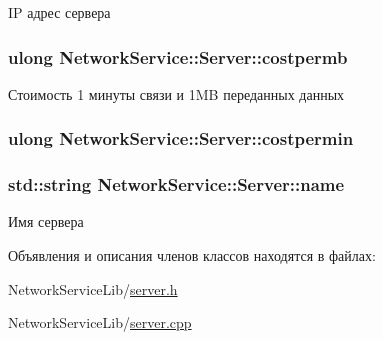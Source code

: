 I\+P адрес сервера 

\hypertarget{class_network_service_1_1_server_a44f0b3aacbbbbbcf0216974c23d1baf1}{}
\subsubsection[{costpermb}]{\setlength{\rightskip}{0pt plus 5cm}ulong Network\+Service\+::\+Server\+::costpermb\hspace{0.3cm}{\ttfamily [private]}}\label{class_network_service_1_1_server_a44f0b3aacbbbbbcf0216974c23d1baf1}


Стоимость 1 минуты связи и 1\+M\+B переданных данных 

\hypertarget{class_network_service_1_1_server_a8b24807f5ca15d5348734cf5f4fe96ff}{}
\subsubsection[{costpermin}]{\setlength{\rightskip}{0pt plus 5cm}ulong Network\+Service\+::\+Server\+::costpermin\hspace{0.3cm}{\ttfamily [private]}}\label{class_network_service_1_1_server_a8b24807f5ca15d5348734cf5f4fe96ff}
\hypertarget{class_network_service_1_1_server_aaab7735b4b5809169ecb92fa66f0bca7}{}
\subsubsection[{name}]{\setlength{\rightskip}{0pt plus 5cm}std\+::string Network\+Service\+::\+Server\+::name\hspace{0.3cm}{\ttfamily [private]}}\label{class_network_service_1_1_server_aaab7735b4b5809169ecb92fa66f0bca7}


Имя сервера 



Объявления и описания членов классов находятся в файлах\+:\begin{DoxyCompactItemize}
\item 
Network\+Service\+Lib/\hyperlink{server_8h}{server.\+h}\item 
Network\+Service\+Lib/\hyperlink{server_8cpp}{server.\+cpp}\end{DoxyCompactItemize}
